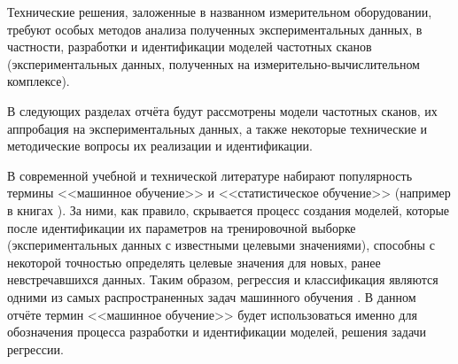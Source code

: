 Технические решения, заложенные в названном измерительном оборудовании, требуют
особых методов анализа полученных экспериментальных данных, в частности,
разработки и идентификации моделей частотных сканов (экспериментальных данных, 
полученных на измерительно-вычислительном комплексе).

В следующих разделах отчёта будут рассмотрены модели частотных сканов, их
аппробация на экспериментальных данных, а также некоторые технические и 
методические вопросы их реализации и идентификации.

В современной учебной и технической литературе набирают популярность термины 
<<машинное обучение>> и <<статистическое обучение>> (например в книгах 
\cite{hands_on_ml, nikolenko_deep_learning, elements_of_statistical_learning}). 
За ними, как правило, скрывается процесс создания моделей, которые после 
идентификации их параметров на тренировочной выборке (экспериментальных данных 
с известными целевыми значениями), способны с некоторой точностью определять 
целевые значения для новых, ранее невстречавшихся данных. Таким образом, 
регрессия и классификация являются одними из самых распространенных задач 
машинного обучения \cite{hands_on_ml}. В данном отчёте термин <<машинное 
обучение>> будет использоваться именно для обозначения процесса разработки и 
идентификации моделей, решения задачи регрессии.